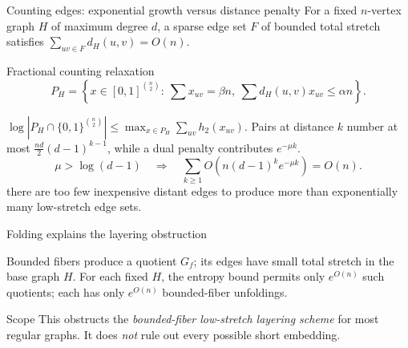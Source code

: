 \begin{frame}{Counting edges: exponential growth versus distance penalty}
 For a fixed $n$-vertex graph $H$ of maximum degree $d$, a sparse edge set $F$ of bounded total stretch satisfies $\sum_{uv\in F}d_H(u,v)=O(n)$.
 \begin{block}{Fractional counting relaxation}
 \[P_H=\left\{x\in[0,1]^{\binom n2}:\ \sum x_{uv}=\beta n,\ \sum d_H(u,v)x_{uv}\le\alpha n\right\}.\]
 \end{block}
  $\log |P_H\cap\{0,1\}^{\binom n2}|\le\max_{x\in P_H}\sum_{uv}h_2(x_{uv})$.
 \vspace{.1cm}
  Pairs at distance $k$ number at most $\frac{nd}{2}(d-1)^{k-1}$, while a dual penalty contributes $e^{-\mu k}$.
 \[\mu>\log(d-1)\quad\Rightarrow\quad \sum_{k\ge1}O\!\left(n(d-1)^ke^{-\mu k}\right)=O(n).\]
 \small{} there are too few inexpensive distant edges to produce more than exponentially many low-stretch edge sets.
\end{frame}


\begin{frame}{Folding explains the layering obstruction}
 \vspace{.20cm}\centering\resizebox{.59\textwidth}{!}{\PreciseFoldFig}\par
 \vspace{.14cm}
  Bounded fibers produce a quotient $G_f$; its edges have small total stretch in the base graph $H$.
 \vspace{.08cm}
  For each fixed $H$, the entropy bound permits only $e^{O(n)}$ such quotients; each has only $e^{O(n)}$ bounded-fiber unfoldings.
 \vspace{.08cm}
 \begin{block}{Scope}
 This obstructs the \emph{bounded-fiber low-stretch layering scheme} for most regular graphs. It does \emph{not} rule out every possible short embedding.
 \end{block}
\end{frame}


